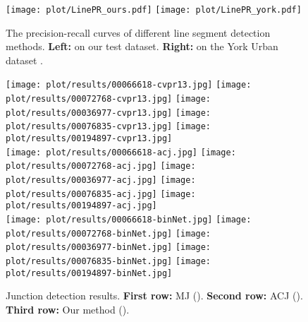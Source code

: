 \documentclass[10pt,twocolumn,letterpaper]{article}
\begin{document}
\begin{figure}[t]
    \centering
    \texttt{[image: plot/LinePR\_ours.pdf]}
    \texttt{[image: plot/LinePR\_york.pdf]}
    \caption{The precision-recall curves of different line segment detection methods. {\bf Left:} on our test dataset. {\bf Right:} on the York Urban dataset \cite{Denis2008EfficientEM}.} \vspace{-3mm}
    \label{fig:LinePR-ours} \label{fig:LinePR-york}
\end{figure}

\begin{figure*}[t!]
\centering


\texttt{[image: plot/results/00066618-cvpr13.jpg]}
\texttt{[image: plot/results/00072768-cvpr13.jpg]}
\texttt{[image: plot/results/00036977-cvpr13.jpg]}
\texttt{[image: plot/results/00076835-cvpr13.jpg]}
\texttt{[image: plot/results/00194897-cvpr13.jpg]}
\\
\texttt{[image: plot/results/00066618-acj.jpg]}
\texttt{[image: plot/results/00072768-acj.jpg]}
\texttt{[image: plot/results/00036977-acj.jpg]}
\texttt{[image: plot/results/00076835-acj.jpg]}
\texttt{[image: plot/results/00194897-acj.jpg]}
\\
\texttt{[image: plot/results/00066618-binNet.jpg]}
\texttt{[image: plot/results/00072768-binNet.jpg]}
\texttt{[image: plot/results/00036977-binNet.jpg]}
\texttt{[image: plot/results/00076835-binNet.jpg]}
\texttt{[image: plot/results/00194897-binNet.jpg]}
\\
\caption{Junction detection results. {\bf First row:} MJ (). {\bf Second row:} ACJ (). {\bf Third row:} Our method (). } \vspace{-1mm}
\label{fig:results}
\end{figure*}
\end{document}
